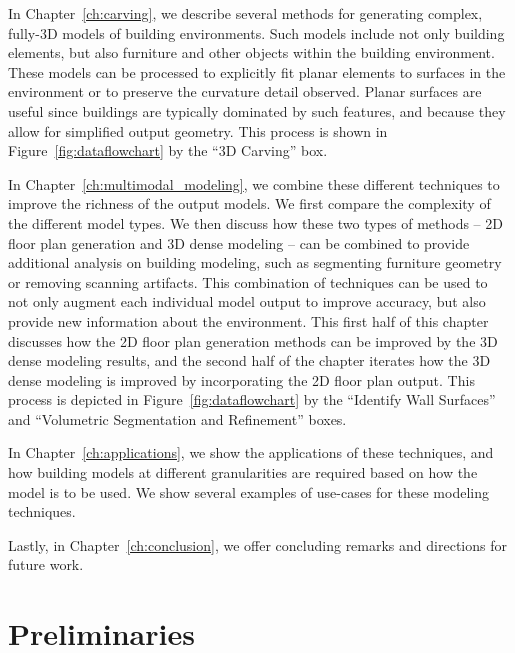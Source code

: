 \documentclass[12pt,onecolumn,oneside]{book}
\begin{document}
In Chapter~\ref{ch:carving}, we describe several methods for generating complex, fully-3D models of building environments.  Such models include not only building elements, but also furniture and other objects within the building environment.  These models can be processed to explicitly fit planar elements to surfaces in the environment or to preserve the curvature detail observed.  Planar surfaces are useful since buildings are typically dominated by such features, and because they allow for simplified output geometry.  This process is shown in Figure~\ref{fig:dataflowchart} by the ``3D Carving'' box.

In Chapter~\ref{ch:multimodal_modeling}, we combine these different techniques to improve the richness of the output models. We first compare the complexity of the different model types.  We then discuss how these two types of methods -- 2D floor plan generation and 3D dense modeling -- can be combined to provide additional analysis on building modeling, such as segmenting furniture geometry or removing scanning artifacts.  This combination of techniques can be used to not only augment each individual model output to improve accuracy, but also provide new information about the environment.  This first half of this chapter discusses how the 2D floor plan generation methods can be improved by the 3D dense modeling results, and the second half of the chapter iterates how the 3D dense modeling is improved by incorporating the 2D floor plan output.  This process is depicted in Figure~\ref{fig:dataflowchart} by the ``Identify Wall Surfaces'' and ``Volumetric Segmentation and Refinement'' boxes.

In Chapter~\ref{ch:applications}, we show the applications of these techniques, and how building models at different granularities are required based on how the model is to be used.  We show several examples of use-cases for these modeling techniques.

Lastly, in Chapter~\ref{ch:conclusion}, we offer concluding remarks and directions for future work.


\chapter{Preliminaries}
\label{ch:preprocessing}
\end{document}
